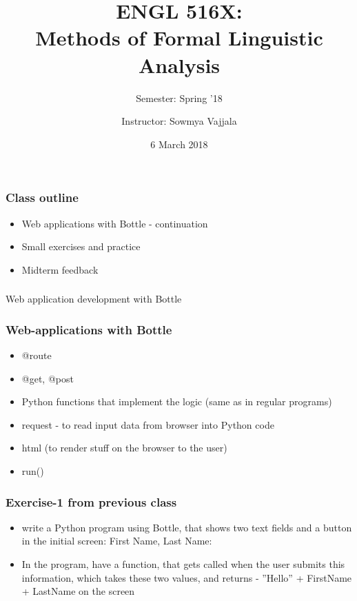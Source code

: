 \documentclass{beamer}
\author[Sowmya Vajjala]{Instructor: Sowmya Vajjala}
\title[ENGL 516X]{ENGL 516X: \\ Methods of Formal Linguistic Analysis}
\subtitle{Semester: Spring '18}
\date{6 March 2018}
\institute{Iowa State University, USA}
\begin{document}
\begin{frame}\titlepage
\end{frame}

\begin{frame}%
\frametitle{Class outline}
\begin{itemize}
\item Web applications with Bottle - continuation
\item Small exercises and practice
\item Midterm feedback
\end{itemize}
\end{frame}

\begin{frame}
\frametitle{}
\begin{center}
Web application development with Bottle
\end{center}
\end{frame}

\begin{frame}
\frametitle{Web-applications with Bottle}
\begin{itemize}
\item @route
\item @get, @post 
\item Python functions that implement the logic (same as in regular programs)
\item request - to read input data from browser into Python code
\item html (to render stuff on the browser to the user)
\item run()
\end{itemize}
\end{frame}

\begin{frame}
\frametitle{Exercise-1 from previous class}
\begin{itemize}
\item write a Python program using Bottle, that shows two text fields and a button in the initial screen: First Name, Last Name:
\item In the program, have a function, that gets called when the user submits this information, which takes these two values, and returns - ”Hello” + FirstName + LastName on the screen
\end{itemize}
\end{frame}
\end{document}
